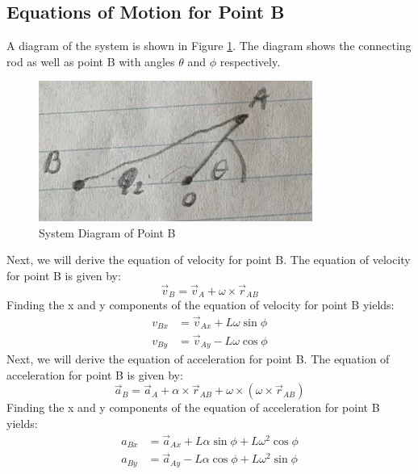 \documentclass[12pt, titlepage]{article}
\begin{document}
\subsection{Equations of Motion for Point B}
A diagram of the system is shown in Figure \ref{fig:systemB}. The diagram
shows the connecting rod as well as point B with angles $\theta$ and $\phi$
respectively.
\begin{figure}[H]
    \centering
    \includegraphics[width=0.8\textwidth]{./Images/f2.png}
    \caption{System Diagram of Point B}
    \label{fig:systemB}
\end{figure}
Next, we will derive the equation of velocity for point B. The equation of
velocity for point B is given by:
\begin{equation}
    \label{eq:velb}
    \vec{v}_B = \vec{v}_A + \omega \times \vec{r}_{AB}
\end{equation}
Finding the x and y components of the equation of velocity for point B yields:
\begin{equation}
    \label{eq:velbxy}
    \begin{split}
        v_{Bx} &= \vec{v}_{Ax} + L\omega\sin\phi\\
        v_{By} &= \vec{v}_{Ay} - L\omega\cos\phi
    \end{split}
\end{equation}
Next, we will derive the equation of acceleration for point B. The equation of
acceleration for point B is given by:
\begin{equation}
    \label{eq:accb}
    \vec{a}_B = \vec{a}_A + \alpha \times \vec{r}_{AB} +
      \omega \times (\omega \times \vec{r}_{AB})
\end{equation}
Finding the x and y components of the equation of acceleration for point B
yields:
\begin{equation}
    \label{eq:accbxy}
    \begin{split}
        a_{Bx} &= \vec{a}_{Ax} + L\alpha\sin\phi + L\omega^2\cos\phi\\
        a_{By} &= \vec{a}_{Ay} - L\alpha\cos\phi + L\omega^2\sin\phi
    \end{split}
\end{equation}
\end{document}
